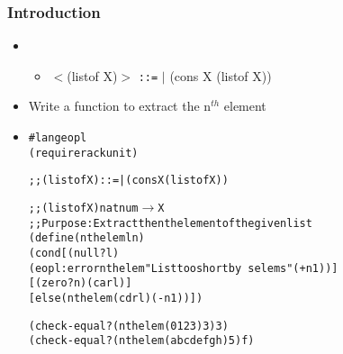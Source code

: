 \documentclass{beamer}
\newcommand{\arrow}{\(\rightarrow\)}
\newcommand{\elist}{\texttt{\textquotesingle{()}}}
\newcommand{\quot}{\texttt{\textquotesingle{}}}
\newcommand{\is}{\texttt{::=}}
\begin{document}
\begin{frame}[fragile]
\frametitle{Introduction}
\begin{scriptsize}
\begin{itemize}
\item<1->
\begin{itemize}
    \item $<$(listof X)$>$ \is{} \elist{} $|$ (cons X (listof X))
\end{itemize}

\item<1-> Write a function to extract the n$^{th}$ element

\item<2->
\begin{alltt}
#lang eopl
(require rackunit)

;; (listof X) \is{} \elist{} | (cons X (listof X))

;; (listof X) natnum \arrow{} X
;; Purpose: Extract the nth element of the given list
(define (nthelem l n)
  (cond [(null? l)
         (eopl:error \quot{}nthelem "List too short by ~s elems" (+ n 1))]
        [(zero? n) (car l)]
        [else (nthelem (cdr l) (- n 1))])

(check-equal? (nthelem \quot{}(0 1 2 3) 3) 3)
(check-equal? (nthelem \quot{}(a b c d e f g h) 5) \quot{}f)
\end{alltt}

\end{itemize}
\end{scriptsize}
\end{frame}
\end{document}
